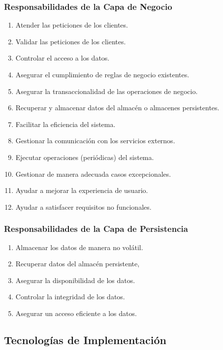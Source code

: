 \documentclass[a4paper,slidestop,xcolor=pst,dvips,blue]{beamer}
\begin{document}
\begin{frame}[c]
	\frametitle{Responsabilidades de la Capa de Negocio}
	\begin{enumerate}[<+->]
        \item Atender las peticiones de los clientes.
        \item Validar las peticiones de los clientes.
        \item Controlar el acceso a los datos.
        \item Asegurar el cumplimiento de \alert{reglas de negocio} existentes.
        \item Asegurar la \alert{transaccionalidad} de las operaciones de negocio.
        \item Recuperar y almacenar datos del almacén o almacenes persistentes.
        \item Facilitar la eficiencia del sistema.
        \item Gestionar la comunicación con los servicios externos.
        \item Ejecutar operaciones (periódicas) del sistema.
        \item Gestionar de manera adecuada casos excepcionales.
        \item Ayudar a mejorar la experiencia de usuario.        
        \item Ayudar a satisfacer requisitos no funcionales.        
	\end{enumerate}
\end{frame}

\begin{frame}[c]
	\frametitle{Responsabilidades de la Capa de Persistencia}
	\begin{enumerate}[<+->]
        \item Almacenar los datos de manera no volátil.
        \item Recuperar datos del almacén persistente,
        \item Asegurar la disponibilidad de los datos.
        \item Controlar la integridad de los datos.
        \item Asegurar un acceso eficiente a los datos.
	\end{enumerate}
\end{frame}

\subsection{Tecnologías de Implementación}
\end{document}
